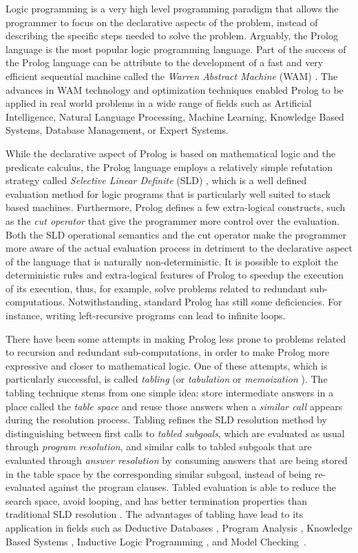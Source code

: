 Logic programming is a very high level programming paradigm that allows the programmer
to focus on the declarative aspects of the problem, instead of describing the specific steps
needed to solve the problem. Arguably, the Prolog language is the most popular logic
programming language. Part of the success of the Prolog language can be attribute to the
development of a fast and very efficient sequential machine called the \emph{Warren Abstract Machine}
(WAM) \cite{Warren-83}. The advances in WAM technology and optimization techniques enabled Prolog
to be applied in real world problems in a wide range of fields such as Artificial Intelligence,
Natural Language Processing, Machine Learning, Knowledge Based Systems, Database Management, or
Expert Systems.

While the declarative aspect of Prolog is based on mathematical logic and the predicate calculus,
the Prolog language employs a relatively simple refutation strategy called \emph{Selective Linear Definite}
(SLD) \cite{Lloyd-87}, which is a well defined evaluation method for logic programs that
is particularly well suited to stack based machines.
Furthermore, Prolog defines a few extra-logical constructs, such as the \emph{cut operator}
that give the programmer more control over the evaluation. Both the SLD operational semantics
and the cut operator make the programmer more aware of the actual evaluation process in detriment to the
declarative aspect of the language that is naturally non-deterministic. It is possible to exploit
the deterministic rules and extra-logical features of Prolog to speedup the execution of its execution,
thus, for example, solve problems related to redundant sub-computations. Notwithstanding, standard Prolog has
still some deficiencies. For instance, writing left-recursive programs can lead to infinite loops.

There have been some attempts in making Prolog less prone to problems related to recursion
and redundant sub-computations, in order to make Prolog more expressive and closer to mathematical logic.
One of these attempts, which is particularly successful, is called \emph{tabling}
(or \emph{tabulation} or \emph{memoization} \cite{Michie-68}). The tabling technique stems from one simple idea:
store intermediate answers in a place called the \emph{table space} and reuse those answers when a
\emph{similar call} appears during the resolution process. Tabling refines the SLD resolution method
by distinguishing between first calls to \emph{tabled subgoals}, which are evaluated as usual through
\emph{program resolution}, and similar calls to tabled subgoals that are evaluated through \emph{answer resolution}
by consuming answers that are being stored in the table space by the corresponding similar subgoal, instead
of being re-evaluated against the program clauses. Tabled evaluation is able to reduce the search space,
avoid looping, and has better termination properties than traditional SLD resolution \cite{Chen-96}.
The advantages of tabling have lead to its application in fields such as Deductive Databases \cite{Sagonas-94},
Program Analysis \cite{RamakrishnanCR-00}, Knowledge Based Systems \cite{Yang-00}, Inductive Logic
Programming \cite{Rocha-05b}, and Model Checking~\cite{RamakrishnanCR-00}.

